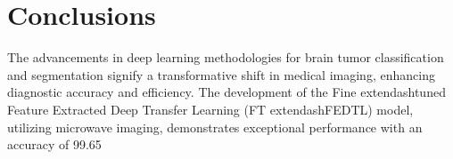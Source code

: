 \documentclass[runningheads]{llncs}
\begin{document}
\section{Conclusions}
The advancements in deep learning methodologies for brain tumor classification and segmentation signify a transformative shift in medical imaging, enhancing diagnostic accuracy and efficiency. The development of the Fine	extendash{}tuned Feature Extracted Deep Transfer Learning (FT	extendash{}FEDTL) model, utilizing microwave imaging, demonstrates exceptional performance with an accuracy of 99.65%
\end{document}
